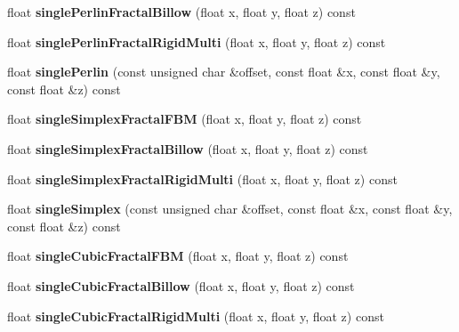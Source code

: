 \begin{DoxyCompactItemize}
float {\bfseries single\+Perlin\+Fractal\+Billow} (float x, float y, float z) const
\item 
\mbox{\label{classnoisefast_a237dab4e4e4f420d745e6d1e937b354e}} 
float {\bfseries single\+Perlin\+Fractal\+Rigid\+Multi} (float x, float y, float z) const
\item 
\mbox{\label{classnoisefast_a633b5328fcfe57d254ab479f1e1344c7}} 
float {\bfseries single\+Perlin} (const unsigned char \&offset, const float \&x, const float \&y, const float \&z) const
\item 
\mbox{\label{classnoisefast_a63f6da3f8c1d363d1350211b9784ca49}} 
float {\bfseries single\+Simplex\+Fractal\+F\+BM} (float x, float y, float z) const
\item 
\mbox{\label{classnoisefast_aace6ad2610c2c1ca2b7e52b9d1578e60}} 
float {\bfseries single\+Simplex\+Fractal\+Billow} (float x, float y, float z) const
\item 
\mbox{\label{classnoisefast_af546e091de1215c52f8530293663664f}} 
float {\bfseries single\+Simplex\+Fractal\+Rigid\+Multi} (float x, float y, float z) const
\item 
\mbox{\label{classnoisefast_a6c338f1a78db61532c9e7607b8fa5dcb}} 
float {\bfseries single\+Simplex} (const unsigned char \&offset, const float \&x, const float \&y, const float \&z) const
\item 
\mbox{\label{classnoisefast_a698f1fc68ba6ebd27c0b039014bbffde}} 
float {\bfseries single\+Cubic\+Fractal\+F\+BM} (float x, float y, float z) const
\item 
\mbox{\label{classnoisefast_ae4afc11f82d43a102ab8098c1ee9a4ed}} 
float {\bfseries single\+Cubic\+Fractal\+Billow} (float x, float y, float z) const
\item 
\mbox{\label{classnoisefast_a4e7617c5e6bbd513a956a64a3b10bd1e}} 
float {\bfseries single\+Cubic\+Fractal\+Rigid\+Multi} (float x, float y, float z) const
\item 
\mbox{\label{classnoisefast_af594171951af10f30fd0ad0c3444c656}} 

\end{DoxyCompactItemize}

